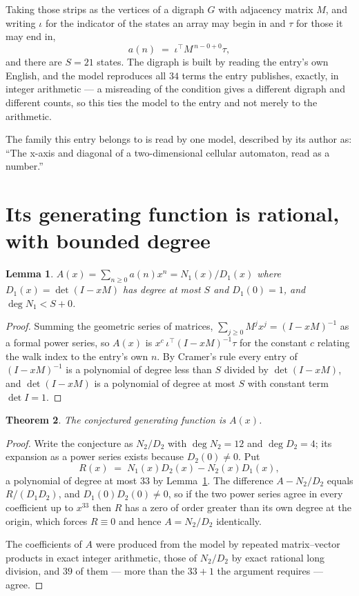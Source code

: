 \documentclass[11pt,a4paper]{article}
\theoremstyle{plain}
\newtheorem{theorem}{Theorem}
\newtheorem{lemma}[theorem]{Lemma}
\theoremstyle{definition}
\begin{document}
Taking those strips as the vertices of a digraph $G$ with adjacency matrix $M$, and writing
$\iota$ for the indicator of the states an array may begin in and $\tau$ for those it may end
in,
\[
a(n)\;=\;\iota^{\!\top}M^{\,n-0+0}\tau ,
\]
and there are $S=21$ states. The digraph is built by reading the entry's own English, and the
model reproduces all $34$ terms the entry publishes, exactly, in integer arithmetic --- a
misreading of the condition gives a different digraph and different counts, so this ties the
model to the entry and not merely to the arithmetic.

The family this entry belongs to is read by one model, described by its author as: ``The x-axis and diagonal of a two-dimensional cellular automaton, read as a number.''


\section{Its generating function is rational, with bounded degree}

\begin{lemma}\label{lem:rat}
$A(x)=\sum_{n\ge0}a(n)x^n=N_1(x)/D_1(x)$ where $D_1(x)=\det(I-xM)$ has degree at most
$S$ and $D_1(0)=1$, and $\deg N_1<S+0$.
\end{lemma}

\begin{proof}
Summing the geometric series of matrices, $\sum_{j\ge0}M^jx^j=(I-xM)^{-1}$ as a formal
power series, so $A(x)$ is $x^{c}\,\iota^{\!\top}(I-xM)^{-1}\tau$ for the constant $c$
relating the walk index to the entry's own $n$. By Cramer's rule every entry of
$(I-xM)^{-1}$ is a polynomial of degree less than $S$ divided by $\det(I-xM)$, and
$\det(I-xM)$ is a polynomial of degree at most $S$ with constant term $\det I=1$.
\end{proof}

\begin{theorem}
The conjectured generating function is $A(x)$.
\end{theorem}

\begin{proof}
Write the conjecture as $N_2/D_2$ with $\deg N_2=12$ and $\deg D_2=4$; its expansion as a
power series exists because $D_2(0)\neq0$. Put
\[
R(x)\;=\;N_1(x)D_2(x)-N_2(x)D_1(x),
\]
a polynomial of degree at most $33$ by Lemma~\ref{lem:rat}. The difference
$A-N_2/D_2$ equals $R/(D_1D_2)$, and $D_1(0)D_2(0)\neq0$, so if the two power series agree in
every coefficient up to $x^{33}$ then $R$ has a zero of order greater than its own
degree at the origin, which forces $R\equiv0$ and hence $A=N_2/D_2$ identically.

The coefficients of $A$ were produced from the model by repeated matrix--vector products in
exact integer arithmetic, those of $N_2/D_2$ by exact rational long division, and $39$
of them --- more than the $33+1$ the argument requires --- agree.
\end{proof}
\end{document}
